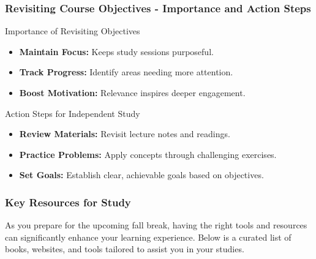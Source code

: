 \documentclass[aspectratio=169]{beamer}
\begin{document}
\begin{frame}[fragile]
    \frametitle{Revisiting Course Objectives - Importance and Action Steps}
    \begin{block}{Importance of Revisiting Objectives}
        \begin{itemize}
            \item \textbf{Maintain Focus:} Keeps study sessions purposeful.
            \item \textbf{Track Progress:} Identify areas needing more attention.
            \item \textbf{Boost Motivation:} Relevance inspires deeper engagement.
        \end{itemize}
    \end{block}
    
    \begin{block}{Action Steps for Independent Study}
        \begin{itemize}
            \item \textbf{Review Materials:} Revisit lecture notes and readings.
            \item \textbf{Practice Problems:} Apply concepts through challenging exercises.
            \item \textbf{Set Goals:} Establish clear, achievable goals based on objectives.
        \end{itemize}
    \end{block}
\end{frame}

\begin{frame}[fragile]
    \frametitle{Key Resources for Study}
    As you prepare for the upcoming fall break, having the right tools and resources can significantly enhance your learning experience. Below is a curated list of books, websites, and tools tailored to assist you in your studies.
\end{frame}
\end{document}

